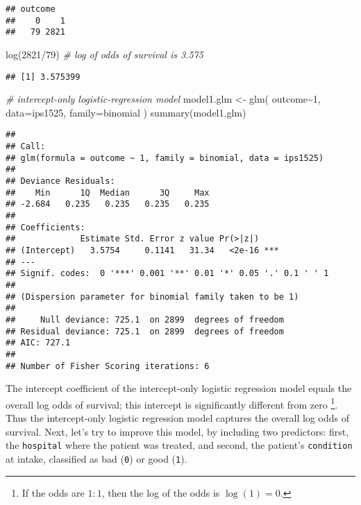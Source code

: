 \documentclass[
]{book}
\newenvironment{Shaded}{\begin{snugshade}}{\end{snugshade}}
\newcommand{\AttributeTok}[1]{\textcolor[rgb]{0.77,0.63,0.00}{#1}}
\newcommand{\CommentTok}[1]{\textcolor[rgb]{0.56,0.35,0.01}{\textit{#1}}}
\newcommand{\DecValTok}[1]{\textcolor[rgb]{0.00,0.00,0.81}{#1}}
\newcommand{\FunctionTok}[1]{\textcolor[rgb]{0.00,0.00,0.00}{#1}}
\newcommand{\NormalTok}[1]{#1}
\newcommand{\OtherTok}[1]{\textcolor[rgb]{0.56,0.35,0.01}{#1}}
\newcommand{\SpecialCharTok}[1]{\textcolor[rgb]{0.00,0.00,0.00}{#1}}
\begin{document}
\begin{verbatim}
## outcome
##    0    1 
##   79 2821
\end{verbatim}

\begin{Shaded}
\begin{Highlighting}[]
\FunctionTok{log}\NormalTok{(}\DecValTok{2821}\SpecialCharTok{/}\DecValTok{79}\NormalTok{) }\CommentTok{\# log of odds of survival is 3.575}
\end{Highlighting}
\end{Shaded}

\begin{verbatim}
## [1] 3.575399
\end{verbatim}

\begin{Shaded}
\begin{Highlighting}[]
\CommentTok{\# intercept{-}only logistic{-}regression model}
\NormalTok{model1.glm }\OtherTok{\textless{}{-}} \FunctionTok{glm}\NormalTok{( outcome}\SpecialCharTok{\textasciitilde{}}\DecValTok{1}\NormalTok{, }\AttributeTok{data=}\NormalTok{ips1525, }\AttributeTok{family=}\NormalTok{binomial )}
\FunctionTok{summary}\NormalTok{(model1.glm) }
\end{Highlighting}
\end{Shaded}

\begin{verbatim}
## 
## Call:
## glm(formula = outcome ~ 1, family = binomial, data = ips1525)
## 
## Deviance Residuals: 
##    Min      1Q  Median      3Q     Max  
## -2.684   0.235   0.235   0.235   0.235  
## 
## Coefficients:
##             Estimate Std. Error z value Pr(>|z|)    
## (Intercept)   3.5754     0.1141   31.34   <2e-16 ***
## ---
## Signif. codes:  0 '***' 0.001 '**' 0.01 '*' 0.05 '.' 0.1 ' ' 1
## 
## (Dispersion parameter for binomial family taken to be 1)
## 
##     Null deviance: 725.1  on 2899  degrees of freedom
## Residual deviance: 725.1  on 2899  degrees of freedom
## AIC: 727.1
## 
## Number of Fisher Scoring iterations: 6
\end{verbatim}

The intercept coefficient of the intercept-only logistic regression
model equals the overall log odds of survival; this intercept is
significantly different from zero \footnote{If the odds are \(1:1\), then the log of the odds is \(\log(1)=0\).}. Thus the intercept-only
logistic regression model captures the overall log odds of survival.
Next, let's try to improve this model, by including two predictors:
first, the \texttt{hospital} where the patient was treated, and second, the
patient's \texttt{condition} at intake, classified as bad
(\texttt{0}) or good (\texttt{1}).
\end{document}
